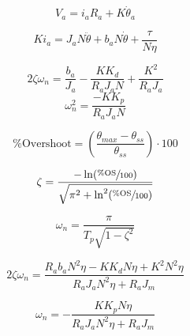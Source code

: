 \documentclass[12pt]{report}
\begin{document}
\[
V_a = i_aR_a + K\dot{\theta}_a
\]

\begin{center}
\end{center}

\[
Ki_a = J_aN\ddot{\theta} + b_aN\dot{\theta} + \frac{\tau}{N\eta}
\]

\begin{equation}
  2\zeta\omega_n = \frac{b_a}{J_a} - \frac{KK_d}{R_aJ_aN} + \frac{K^2}{R_aJ_a}
\end{equation}
\begin{equation}
  \omega_n^2 = \frac{-KK_p}{R_aJ_aN}
\end{equation}

\begin{equation}
  \text{\% Overshoot} = \left( \frac{\theta_{max} - \theta_{ss}}{\theta_{ss}} \right) \cdot 100
\end{equation}

\begin{equation}
  \zeta = \frac{-\ln(\sfrac{\%\text{OS}}{100})}{\sqrt{\pi^2 + \ln^2(\sfrac{\%\text{OS}}{100})}}
\end{equation}

\begin{equation}
  \omega_n = \frac{\pi}{T_p\sqrt{1-\zeta^2}}
\end{equation}

\begin{equation}
  2\zeta\omega_n = \frac{R_ab_aN^2\eta-KK_dN\eta+K^2N^2\eta}{R_aJ_aN^2\eta+R_aJ_m}
\end{equation}

\begin{equation}
  \omega_n =-\frac{KK_pN\eta}{R_aJ_aN^2\eta+R_aJ_m}
\end{equation}






\end{document}
